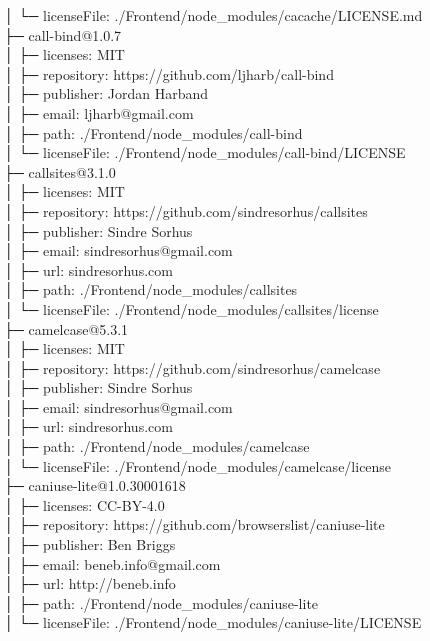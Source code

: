│  └─ licenseFile: ./Frontend/node\_modules/cacache/LICENSE.md\\
├─ call-bind@1.0.7\\
│  ├─ licenses: MIT\\
│  ├─ repository: https://github.com/ljharb/call-bind\\
│  ├─ publisher: Jordan Harband\\
│  ├─ email: ljharb@gmail.com\\
│  ├─ path: ./Frontend/node\_modules/call-bind\\
│  └─ licenseFile: ./Frontend/node\_modules/call-bind/LICENSE\\
├─ callsites@3.1.0\\
│  ├─ licenses: MIT\\
│  ├─ repository: https://github.com/sindresorhus/callsites\\
│  ├─ publisher: Sindre Sorhus\\
│  ├─ email: sindresorhus@gmail.com\\
│  ├─ url: sindresorhus.com\\
│  ├─ path: ./Frontend/node\_modules/callsites\\
│  └─ licenseFile: ./Frontend/node\_modules/callsites/license\\
├─ camelcase@5.3.1\\
│  ├─ licenses: MIT\\
│  ├─ repository: https://github.com/sindresorhus/camelcase\\
│  ├─ publisher: Sindre Sorhus\\
│  ├─ email: sindresorhus@gmail.com\\
│  ├─ url: sindresorhus.com\\
│  ├─ path: ./Frontend/node\_modules/camelcase\\
│  └─ licenseFile: ./Frontend/node\_modules/camelcase/license\\
├─ caniuse-lite@1.0.30001618\\
│  ├─ licenses: CC-BY-4.0\\
│  ├─ repository: https://github.com/browserslist/caniuse-lite\\
│  ├─ publisher: Ben Briggs\\
│  ├─ email: beneb.info@gmail.com\\
│  ├─ url: http://beneb.info\\
│  ├─ path: ./Frontend/node\_modules/caniuse-lite\\
│  └─ licenseFile: ./Frontend/node\_modules/caniuse-lite/LICENSE\\
